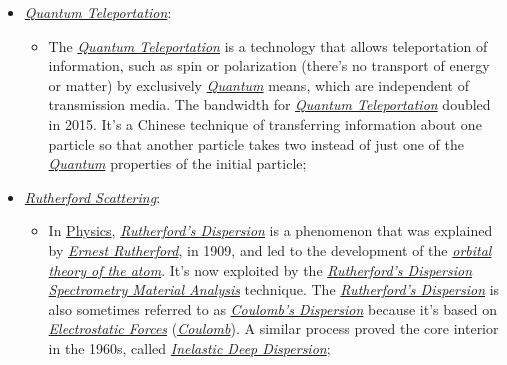 \documentclass[conference]{IEEEtran}
\begin{document}
\begin{itemize}
  \item \href{https://en.wikipedia.org/wiki/Quantum_teleportation}{\textit{Quantum Teleportation}}:
    \begin{itemize}
        \item The \href{https://en.wikipedia.org/wiki/Quantum_teleportation}{\textit{Quantum Teleportation}} is a technology that allows teleportation of information, such as spin or polarization (there's no transport of energy or matter) by exclusively \href{https://en.wikipedia.org/wiki/Quantum}{\textit{Quantum}} means, which are independent of transmission media. The bandwidth for \href{https://en.wikipedia.org/wiki/Quantum_teleportation}{\textit{Quantum Teleportation}} doubled in 2015. It's a Chinese technique of transferring information about one particle so that another particle takes two instead of just one of the \href{https://en.wikipedia.org/wiki/Quantum}{\textit{Quantum}} properties of the initial particle;
    \end{itemize}

  \vspace{4pt}

  \item \href{https://en.wikipedia.org/wiki/Rutherford_scattering}{\textit{Rutherford Scattering}}:
    \begin{itemize}
        \item In \href{https://en.wikipedia.org/wiki/Physics}{Physics}, \href{https://en.wikipedia.org/wiki/Rutherford_scattering}{\textit{Rutherford's Dispersion}} is a phenomenon that was explained by \href{https://en.wikipedia.org/wiki/Ernest_Rutherford}{\textit{Ernest Rutherford}}, in 1909, and led to the development of the \href{https://en.wikipedia.org/wiki/Atomic_orbital}{\textit{orbital theory of the atom}}. It's now exploited by the \href{https://en.wikipedia.org/wiki/Rutherford_scattering}{\textit{Rutherford's Dispersion Spectrometry Material Analysis}} technique. The \href{https://en.wikipedia.org/wiki/Rutherford_scattering}{\textit{Rutherford's Dispersion}} is also sometimes referred to as \href{https://en.wikipedia.org/wiki/Rutherford_scattering}{\textit{Coulomb's Dispersion}} because it's based on \href{https://en.wikipedia.org/wiki/Electrostatics}{\textit{Electrostatic Forces}} (\href{https://en.wikipedia.org/wiki/Coulomb\%27s_law}{\textit{Coulomb}}). A similar process proved the core interior in the 1960s, called \href{https://arxiv.org/abs/1601.05453}{\textit{Inelastic Deep Dispersion}};
    \end{itemize}
    

\end{itemize}
\end{document}

